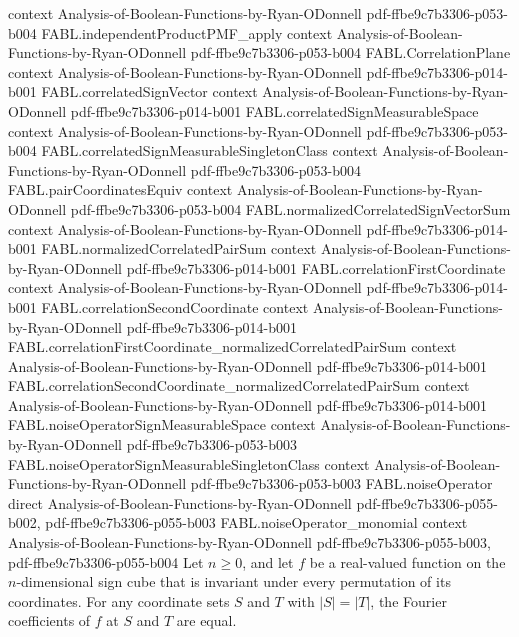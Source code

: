 \begin{theorem}
  {context}
  {Analysis-of-Boolean-Functions-by-Ryan-ODonnell}
  {pdf-ffbe9c7b3306-p053-b004}
\proofstep
  {FABL.independentProductPMF_apply}
  {context}
  {Analysis-of-Boolean-Functions-by-Ryan-ODonnell}
  {pdf-ffbe9c7b3306-p053-b004}
\proofstep
  {FABL.CorrelationPlane}
  {context}
  {Analysis-of-Boolean-Functions-by-Ryan-ODonnell}
  {pdf-ffbe9c7b3306-p014-b001}
\proofstep
  {FABL.correlatedSignVector}
  {context}
  {Analysis-of-Boolean-Functions-by-Ryan-ODonnell}
  {pdf-ffbe9c7b3306-p014-b001}
\proofstep
  {FABL.correlatedSignMeasurableSpace}
  {context}
  {Analysis-of-Boolean-Functions-by-Ryan-ODonnell}
  {pdf-ffbe9c7b3306-p053-b004}
\proofstep
  {FABL.correlatedSignMeasurableSingletonClass}
  {context}
  {Analysis-of-Boolean-Functions-by-Ryan-ODonnell}
  {pdf-ffbe9c7b3306-p053-b004}
\proofstep
  {FABL.pairCoordinatesEquiv}
  {context}
  {Analysis-of-Boolean-Functions-by-Ryan-ODonnell}
  {pdf-ffbe9c7b3306-p053-b004}
\proofstep
  {FABL.normalizedCorrelatedSignVectorSum}
  {context}
  {Analysis-of-Boolean-Functions-by-Ryan-ODonnell}
  {pdf-ffbe9c7b3306-p014-b001}
\proofstep
  {FABL.normalizedCorrelatedPairSum}
  {context}
  {Analysis-of-Boolean-Functions-by-Ryan-ODonnell}
  {pdf-ffbe9c7b3306-p014-b001}
\proofstep
  {FABL.correlationFirstCoordinate}
  {context}
  {Analysis-of-Boolean-Functions-by-Ryan-ODonnell}
  {pdf-ffbe9c7b3306-p014-b001}
\proofstep
  {FABL.correlationSecondCoordinate}
  {context}
  {Analysis-of-Boolean-Functions-by-Ryan-ODonnell}
  {pdf-ffbe9c7b3306-p014-b001}
\proofstep
  {FABL.correlationFirstCoordinate_normalizedCorrelatedPairSum}
  {context}
  {Analysis-of-Boolean-Functions-by-Ryan-ODonnell}
  {pdf-ffbe9c7b3306-p014-b001}
\proofstep
  {FABL.correlationSecondCoordinate_normalizedCorrelatedPairSum}
  {context}
  {Analysis-of-Boolean-Functions-by-Ryan-ODonnell}
  {pdf-ffbe9c7b3306-p014-b001}
\proofstep
  {FABL.noiseOperatorSignMeasurableSpace}
  {context}
  {Analysis-of-Boolean-Functions-by-Ryan-ODonnell}
  {pdf-ffbe9c7b3306-p053-b003}
\proofstep
  {FABL.noiseOperatorSignMeasurableSingletonClass}
  {context}
  {Analysis-of-Boolean-Functions-by-Ryan-ODonnell}
  {pdf-ffbe9c7b3306-p053-b003}
\proofstep
  {FABL.noiseOperator}
  {direct}
  {Analysis-of-Boolean-Functions-by-Ryan-ODonnell}
  {pdf-ffbe9c7b3306-p055-b002,
    pdf-ffbe9c7b3306-p055-b003}
\proofstep
  {FABL.noiseOperator_monomial}
  {context}
  {Analysis-of-Boolean-Functions-by-Ryan-ODonnell}
  {pdf-ffbe9c7b3306-p055-b003,
    pdf-ffbe9c7b3306-p055-b004}
Let $n\ge 0$, and let $f$ be a real-valued function on the $n$-dimensional sign cube
that is invariant under every permutation of its coordinates. For any coordinate sets
$S$ and $T$ with $|S|=|T|$, the Fourier coefficients of $f$ at $S$ and $T$ are equal.
\end{theorem}

